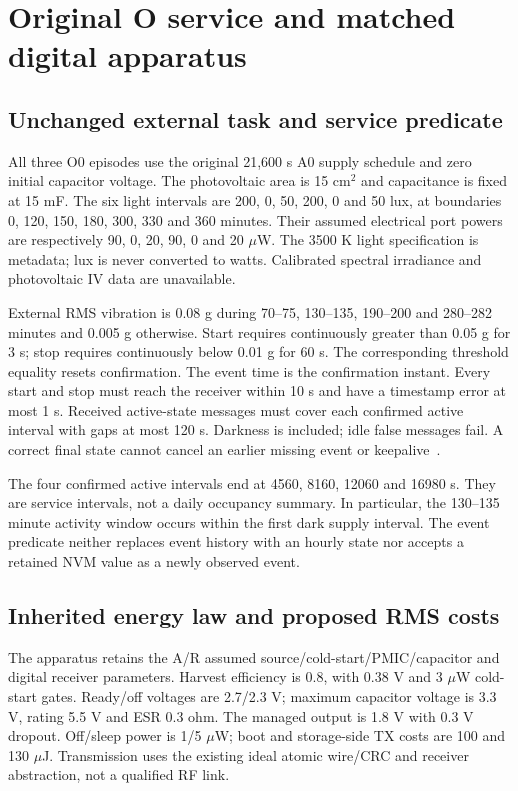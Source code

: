 \section{Original O service and matched digital apparatus}
\subsection{Unchanged external task and service predicate}
All three O0 episodes use the original 21,600 s A0 supply schedule and zero
initial capacitor voltage. The photovoltaic area is 15 cm$^2$ and capacitance
is fixed at 15 mF. The six light intervals are 200, 0, 50, 200, 0 and 50 lux,
at boundaries 0, 120, 150, 180, 300, 330 and 360 minutes. Their assumed
electrical port powers are respectively 90, 0, 20, 90, 0 and 20 $\mu$W.
The 3500 K light specification is metadata; lux is never converted to watts.
Calibrated spectral irradiance and photovoltaic IV data are unavailable.

External RMS vibration is 0.08 g during 70--75, 130--135, 190--200 and
280--282 minutes and 0.005 g otherwise. Start requires continuously greater
than 0.05 g for 3 s; stop requires continuously below 0.01 g for 60 s.
The corresponding threshold equality resets confirmation. The event time is
the confirmation instant. Every start and stop must reach the receiver within
10 s and have a timestamp error at most 1 s. Received active-state messages
must cover each confirmed active interval with gaps at most 120 s. Darkness
is included; idle false messages fail. A correct final state cannot cancel
an earlier missing event or keepalive~\cite{case}.

The four confirmed active intervals end at 4560, 8160, 12060 and 16980 s.
They are service intervals, not a daily occupancy summary. In particular, the
130--135 minute activity window occurs within the first dark supply interval.
The event predicate neither replaces event history with an hourly state nor
accepts a retained NVM value as a newly observed event.

\subsection{Inherited energy law and proposed RMS costs}
The apparatus retains the A/R assumed source/cold-start/PMIC/capacitor and
digital receiver parameters. Harvest efficiency is 0.8, with 0.38 V and
3 $\mu$W cold-start gates. Ready/off voltages are 2.7/2.3 V; maximum capacitor
voltage is 3.3 V, rating 5.5 V and ESR 0.3 ohm. The managed output is 1.8 V
with 0.3 V dropout. Off/sleep power is 1/5 $\mu$W; boot and storage-side TX
costs are 100 and 130 $\mu$J. Transmission uses the existing ideal atomic
wire/CRC and receiver abstraction, not a qualified RF link.

